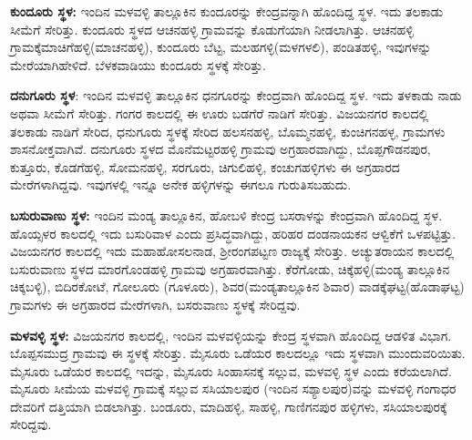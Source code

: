 \textbf{ಕುಂದೂರು ಸ್ಥಳ:} ಇಂದಿನ ಮಳವಳ್ಳಿ ತಾಲ್ಲೂಕಿನ ಕುಂದೂರನ್ನು ಕೇಂದ್ರವನ್ನಾಗಿ ಹೊಂದಿದ್ದ ಸ್ಥಳ. ಇದು ತಲಕಾಡು ಸೀಮೆಗೆ ಸೇರಿತ್ತು. ಕುಂದೂರು ಸ್ಥಳದ ಆಚನಹಳ್ಳಿ ಗ್ರಾಮವನ್ನು ಕೊಡುಗೆಯಾಗಿ ನೀಡಲಾಗಿತ್ತು. ಆಚನಹಳ್ಳಿ ಗ್ರಾಮಕ್ಕೆ\break ಮಾಚಿಗೆಹಳ್ಳಿ(ಮಾಚನಹಳ್ಳಿ), ಕುಂದೂರು ಬೆಟ್ಟ, ಮಲಹಗಳ್ಳಿ(ಮಳಗಳಲಿ), ಪಂಡಿತಹಳ್ಳಿ, ಇವುಗಳನ್ನು ಮೇರೆಯಾಗಿ\break ಹೇಳಿದೆ. ಬೆಳಕವಾಡಿಯು ಕುಂದೂರು ಸ್ಥಳಕ್ಕೆ ಸೇರಿತ್ತು.

\textbf{ದನುಗೂರು ಸ್ಥಳ}: ಇಂದಿನ ಮಳವಳ್ಳಿ ತಾಲ್ಲೂಕಿನ ಧನಗೂರನ್ನು ಕೇಂದ್ರವಾಗಿ ಹೊಂದಿದ್ದ ಸ್ಥಳ. ಇದು ತಳಕಾಡು ನಾಡು ಅಥವಾ ಸೀಮೆಗೆ ಸೇರಿತ್ತು. ಗಂಗರ ಕಾಲದಲ್ಲಿ ಈ ಊರು ಬಡಗೆರೆ ನಾಡಿಗೆ ಸೇರಿತ್ತು. ವಿಜಯನಗರ ಕಾಲದಲ್ಲಿ ತಲಕಾಡು ನಾಡಿಗೆ ಸೇರಿದ, ಧನುಗೂರು ಸ್ಥಳಕ್ಕೆ ಸೇರಿದ ಹಲಸನಹಳ್ಳಿ, ಬೊಮ್ಮನಹಳ್ಳಿ, ಕುಂಚಿಗನಹಳ್ಳ, ಗ್ರಾಮಗಳು ಶಾಸನೋಕ್ತವಾಗಿವೆ. ದನುಗೂರು ಸ್ಥಳದ ಮೊನೆಮಟ್ಟರಹಳ್ಳಿ ಗ್ರಾಮವು ಅಗ್ರಹಾರವಾಗಿದ್ದು, ಬೊಪ್ಪಗೌಡನಪುರ, ಕುತ್ತೂರು, ಕೊಡಗೆಹಳ್ಳಿ, ಸೋಮನಹಳ್ಳಿ, ಸರಗೂರು, ಚಿಗುಲಿಹಳ್ಳಿ, ಕಂಚುಗಹಳ್ಳಿಗಳು ಈ ಅಗ್ರಹಾರದ ಮೇರೆಗಳಾಗಿದ್ದವು. ಇವುಗಳಲ್ಲಿ ಇನ್ನೂ ಅನೇಕ ಹಳ್ಳಿಗಳನ್ನು ಈಗಲೂ ಗುರುತಿಸಬಹುದು.

\textbf{ಬಸುರುವಾಣು ಸ್ಥಳ:} ಇಂದಿನ ಮಂಡ್ಯ ತಾಲ್ಲೂಕಿನ, ಹೋಬಳಿ ಕೇಂದ್ರ ಬಸರಾಳನ್ನು ಕೇಂದ್ರವಾಗಿ ಹೊಂದಿದ್ದ ಸ್ಥಳ. ಹೊಯ್ಸಳರ ಕಾಲದಲ್ಲಿ ಇದು ಬಸುರಿವಾಳ ಎಂದು ಪ್ರಸಿದ್ಧವಾಗಿದ್ದು, ಹರಿಹರ ದಂಡನಾಯಕನ ಆಳ್ವಿಕೆಗೆ ಒಳಪಟ್ಟಿತ್ತು. ವಿಜಯನಗರ ಕಾಲದಲ್ಲಿ ಇದು ಮಹಾಹೋಸಲನಾಡ, ಶ‍್ರೀರಂಗಪಟ್ಟಣ ರಾಜ್ಯಕ್ಕೆ ಸೇರಿತ್ತು. ಅಚ್ಯುತರಾಯನ ಕಾಲದಲ್ಲಿ ಬಸುರುವಾಣು ಸ್ಥಳದ ಮಾರಗೊಂಡಹಳ್ಳಿ ಗ್ರಾಮವು ಅಗ್ರಹಾರವಾಗಿತ್ತು. ಕೆರೆಗೋಡು, ಚಿಕ್ಕೆಹಳ್ಳಿ(ಮಂಡ್ಯ ತಾಲ್ಲೂಕಿನ ಚಿಕ್ಕಬಳ್ಳಿ), ಬಿದಿರಕೋಟೆ, ಗೋಲೂರು (ಗೂಳೂರು), ಶಿವರ(ಮಂಡ್ಯತಾಲ್ಲೂಕಿನ ಶಿವಾರ) ವಾಡಕ್ಕೆಘಟ್ಟ(ಹೊಡಾಘಟ್ಟ) ಗ್ರಾಮಗಳು ಈ ಅಗ್ರಹಾರದ ಮೇರೆಗಳಾಗಿ, ಬಸರುವಾಣು ಸ್ಥಳಕ್ಕೆ ಸೇರಿದ್ದವು.

\textbf{ಮಳವಳ್ಳಿ ಸ್ಥಳ:} ವಿಜಯನಗರ ಕಾಲದಲ್ಲಿ, ಇಂದಿನ ಮಳವಳ್ಳಿಯನ್ನು ಕೇಂದ್ರ ಸ್ಥಳವಾಗಿ ಹೊಂದಿದ್ದ ಆಡಳಿತ ವಿಭಾಗ. ಬೊಪ್ಪಸಮುದ್ರ ಗ್ರಾಮವು ಈ ಸ್ಥಳಕ್ಕೆ ಸೇರಿತ್ತು. ಮೈಸೂರು ಒಡೆಯರ ಕಾಲದಲ್ಲೂ ಇದು ಸ್ಥಳವಾಗಿ ಮುಂದುವರಿಯಿತು. ಮೈಸೂರು ಒಡೆಯರ ಕಾಲದಲ್ಲಿ ಇದನ್ನು, ಮೈಸೂರು ಸಿಂಹಾಸನಕ್ಕೆ ಸಲ್ಲುವ, ಮಳವಳ್ಳಿ ಸ್ಥಳ ಎಂದು ಕರೆಯಲಾಗಿದೆ. ಮೈಸೂರು ಸೀಮೆಯ ಮಳವಳ್ಳಿ ಗ್ರಾಮಕ್ಕೆ ಸಲ್ಲುವ ಸಸಿಯಾಲಪುರ (ಇಂದಿನ ಸಶ್ಯಾಲಪುರ)ವನ್ನು ಮಳವಳ್ಳಿ ಗಂಗಾಧರ ದೇವರಿಗೆ ದತ್ತಿಯಾಗಿ ಬಿಡಲಾಗಿತ್ತು. ಬಂಡೂರು, ಮಾದಿಹಳ್ಳಿ, ಸಾಹಳ್ಳಿ, ಗಾಣಿಗನಪುರ ಹಳ್ಳಿಗಳು, ಸಸಿಯಾಲಪುರಕ್ಕೆ ಸೇರಿದ್ದವು.

